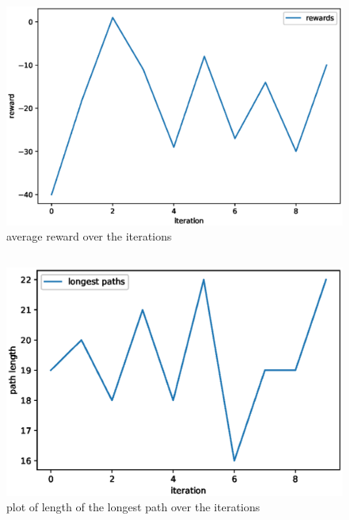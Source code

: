 \documentclass[11pt,a4paper]{article}
\begin{document}
\section{}

\subsection{}
\begin{figure}[!h]
  \includegraphics[width=.7\textwidth]{reward.eps}
  \centering
  \caption{average reward over the iterations}
  \label{fig1}
\end{figure}

\subsection{}

\begin{figure}[h!]
  \includegraphics[width=.7\textwidth]{path_length.eps}
  \centering
  \caption{plot of length of the longest path over the iterations}
  \label{fig2}
\end{figure}
\end{document}
